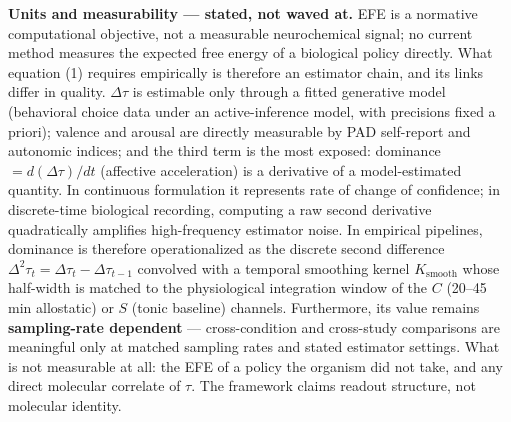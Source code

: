 \documentclass[11pt,twocolumn]{article}
\theoremstyle{plain}
\begin{document}
\textbf{Units and measurability — stated, not waved at.} EFE is a normative computational objective, not a measurable neurochemical signal; no current method measures the expected free energy of a biological policy directly. What equation (1) requires empirically is therefore an estimator chain, and its links differ in quality. $\Delta\tau$ is estimable only through a fitted generative model (behavioral choice data under an active-inference model, with precisions fixed a priori); valence and arousal are directly measurable by PAD self-report and autonomic indices; and the third term is the most exposed: dominance $= d(\Delta\tau)/dt$ (affective acceleration) is a derivative of a model-estimated quantity. In continuous formulation it represents rate of change of confidence; in discrete-time biological recording, computing a raw second derivative quadratically amplifies high-frequency estimator noise. In empirical pipelines, dominance is therefore operationalized as the discrete second difference $\Delta^2\tau_t = \Delta\tau_t - \Delta\tau_{t-1}$ convolved with a temporal smoothing kernel $K_{\mathrm{smooth}}$ whose half-width is matched to the physiological integration window of the $C$ (20--45 min allostatic) or $S$ (tonic baseline) channels. Furthermore, its value remains \textbf{sampling-rate dependent} — cross-condition and cross-study comparisons are meaningful only at matched sampling rates and stated estimator settings. What is not measurable at all: the EFE of a policy the organism did not take, and any direct molecular correlate of $\tau$. The framework claims readout structure, not molecular identity.
\end{document}
